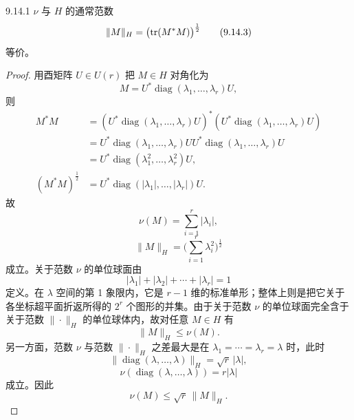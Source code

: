 \begin{lemma*}{9.14.1}
  $\nu$ 与 $H$ 的通常范数
  \begin{equation}
    \|M\|_H=\bigl(\operatorname{tr}(M^*M)\bigr)^{\frac12}
    \tag{9.14.3}
  \end{equation}
  等价。
\end{lemma*}
\begin{proof}
  用酉矩阵 $U\in U(r)$ 把 $M\in H$ 对角化为
  \begin{equation}
    M=U^*\operatorname{diag}(\lambda_1,\dots,\lambda_r)U,
    \tag{9.14.4}
  \end{equation}
  则
  \begin{align*}
    M^*M&=(U^*\operatorname{diag}(\lambda_1,\dots,\lambda_r)U)^*(U^*\operatorname{diag}(\lambda_1,\dots,\lambda_r)U)\\
    &=U^*\operatorname{diag}(\lambda_1,\dots,\lambda_r)UU^*\operatorname{diag}(\lambda_1,\dots,\lambda_r)U\\
    &=U^*\operatorname{diag}(\lambda_1^2,\dots,\lambda_r^2)U,\\
    (M^*M)^{\frac12}&=U^*\operatorname{diag}(|\lambda_1|,\dots,|\lambda_r|)U.
  \end{align*}
  故
  \begin{equation}
    \nu(M)=\sum_{i=1}^r|\lambda_i|,
    \tag{9.14.5}
  \end{equation}
  \begin{equation}
    \|M\|_H=\biggl(\sum_{i=1}^r\lambda_i^2\biggr)^{\frac12}
    \tag{9.14.6}
  \end{equation}
  成立。关于范数 $\nu$ 的单位球面由
  \begin{equation}
    |\lambda_1|+|\lambda_2|+\cdots+|\lambda_r|=1
    \tag{9.14.7}
  \end{equation}
  定义。在 $\lambda$ 空间的第 1 象限内，它是 $r-1$ 维的标准单形；整体上则是把它关于各坐标超平面折返所得的 $2^r$ 个图形的并集。由于关于范数 $\nu$ 的单位球面完全含于关于范数 $\|\cdot\|_H$ 的单位球体内，故对任意 $M\in H$ 有
  \begin{equation}
    \|M\|_H\le\nu(M).
    \tag{9.14.8}
  \end{equation}
  另一方面，范数 $\nu$ 与范数 $\|\cdot\|_H$ 之差最大是在 $\lambda_1=\cdots=\lambda_r=\lambda$ 时，此时
  \begin{equation}
    \|\operatorname{diag}(\lambda,\dots,\lambda)\|_H=\sqrt r\,|\lambda|,
    \tag{9.14.9}
  \end{equation}
  \begin{equation}
    \nu(\operatorname{diag}(\lambda,\dots,\lambda))=r|\lambda|
    \tag{9.14.10}
  \end{equation}
  成立。因此
  \begin{equation}
    \nu(M)\le\sqrt r\,\|M\|_H.
    \tag{9.14.11}
  \end{equation}
\end{proof}

